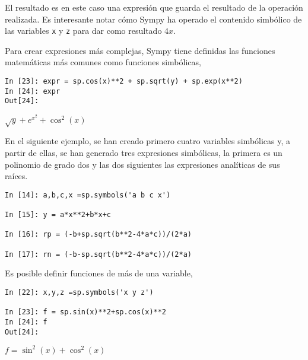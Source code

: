 \begin{paracol}{2}
El resultado es en este caso una expresión que guarda el resultado de la operación realizada. Es interesante notar cómo Sympy ha operado el contenido simbólico de las variables \texttt{x} y \texttt{z} para dar como resultado $4x$.

Para crear expresiones más complejas, Sympy tiene definidas las funciones matemáticas más comunes como funciones simbólicas,
\end{paracol}

\begin{center}
\begin{minipage}{.8\textwidth}
	\begin{verbatim}
In [23]: expr = sp.cos(x)**2 + sp.sqrt(y) + sp.exp(x**2)
In [24]: expr
Out[24]: 			
	\end{verbatim}
	$\sqrt{y}+e^{x^2}+\cos^2(x)$
\end{minipage}
\end{center}

\begin{paracol}{2}
En el siguiente ejemplo, se han creado primero cuatro variables simbólicas y, a partir de ellas, se han generado tres expresiones simbólicas, la primera es un polinomio de grado dos y las dos siguientes las expresiones analíticas de sus raíces.
\end{paracol}
\begin{center}
\begin{minipage}{.5\textwidth}
	\begin{verbatim}
In [14]: a,b,c,x =sp.symbols('a b c x')

In [15]: y = a*x**2+b*x+c

In [16]: rp = (-b+sp.sqrt(b**2-4*a*c))/(2*a)

In [17]: rn = (-b-sp.sqrt(b**2-4*a*c))/(2*a)
	\end{verbatim}
\end{minipage}
\end{center}
\begin{paracol}{2}
Es posible definir funciones de más de una variable,
\end{paracol}
\begin{center}
	\begin{minipage}{.5\textwidth}
		\begin{verbatim}
In [22]: x,y,z =sp.symbols('x y z')
			
In [23]: f = sp.sin(x)**2+sp.cos(x)**2
In [24]: f
Out[24]: 
		\end{verbatim}
		$f = \sin^2(x) + \cos^2(x)$
	\end{minipage}
\end{center}

